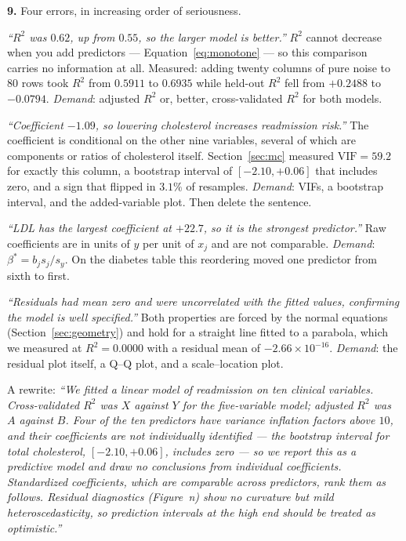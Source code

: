 \documentclass[11pt]{article}
\begin{document}
\medskip
\textbf{9.} Four errors, in increasing order of seriousness.

\emph{``$R^2$ was $0.62$, up from $0.55$, so the larger model is better.''}
$R^2$ cannot decrease when you add predictors --- Equation~\eqref{eq:monotone}
--- so this comparison carries no information at all. Measured: adding twenty
columns of pure noise to $80$ rows took $R^2$ from $0.5911$ to $0.6935$ while
held-out $R^2$ fell from $+0.2488$ to $-0.0794$. \emph{Demand}: adjusted $R^2$
or, better, cross-validated $R^2$ for both models.

\emph{``Coefficient $-1.09$, so lowering cholesterol increases readmission
risk.''} The coefficient is conditional on the other nine variables, several
of which are components or ratios of cholesterol itself. Section~\ref{sec:mc}
measured $\mathrm{VIF} = 59.2$ for exactly this column, a bootstrap interval
of $[-2.10, +0.06]$ that includes zero, and a sign that flipped in $3.1\%$ of
resamples. \emph{Demand}: VIFs, a bootstrap interval, and the added-variable
plot. Then delete the sentence.

\emph{``LDL has the largest coefficient at $+22.7$, so it is the strongest
predictor.''} Raw coefficients are in units of $y$ per unit of $x_j$ and are
not comparable. \emph{Demand}: $\beta^* = b_js_j/s_y$. On the diabetes table
this reordering moved one predictor from sixth to first.

\emph{``Residuals had mean zero and were uncorrelated with the fitted values,
confirming the model is well specified.''} Both properties are forced by the
normal equations (Section~\ref{sec:geometry}) and hold for a straight line
fitted to a parabola, which we measured at $R^2 = 0.0000$ with a residual mean
of $-2.66\times10^{-16}$. \emph{Demand}: the residual plot itself, a Q--Q
plot, and a scale--location plot.

A rewrite: \emph{``We fitted a linear model of readmission on ten clinical
variables. Cross-validated $R^2$ was $X$ against $Y$ for the five-variable
model; adjusted $R^2$ was $A$ against $B$. Four of the ten predictors have
variance inflation factors above $10$, and their coefficients are not
individually identified --- the bootstrap interval for total cholesterol,
$[-2.10, +0.06]$, includes zero --- so we report this as a predictive model
and draw no conclusions from individual coefficients. Standardized
coefficients, which are comparable across predictors, rank them as follows.
Residual diagnostics (Figure~n) show no curvature but mild
heteroscedasticity, so prediction intervals at the high end should be treated
as optimistic.''}
\end{document}
